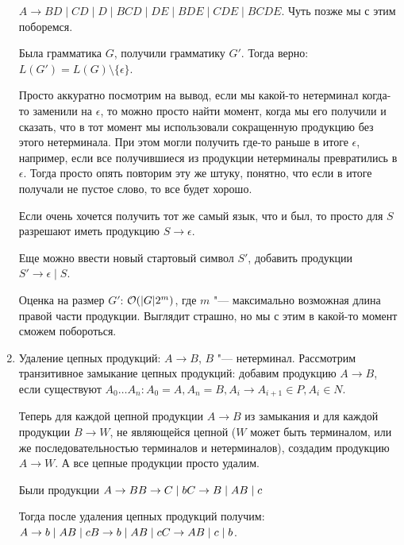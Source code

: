 \begin{enumerate}
\begin{Rem}
$A \to BD \mid CD \mid D \mid BCD \mid DE \mid BDE \mid CDE \mid BCDE$. 
Чуть позже мы с этим поборемся.
\end{Rem}

Была грамматика $G$, получили грамматику $G'$. Тогда верно: $L(G') = L(G) \setminus \{\epsilon\}$.

Просто аккуратно посмотрим на вывод, если мы какой-то нетерминал когда-то заменили на $\epsilon$, то можно просто найти момент, когда мы его получили и сказать, что в тот момент
мы использовали сокращенную продукцию без этого нетерминала.
При этом могли получить где-то раньше в итоге $\epsilon$, например, если все получившиеся из продукции нетерминалы превратились в $\epsilon$. 
Тогда просто опять повторим эту же штуку, понятно, что если в итоге получали не пустое слово, то все будет хорошо.

\begin{Rem}
Если очень хочется получить тот же самый язык, что и был, то просто для $S$ разрешают иметь продукцию $S \to \epsilon$.

Еще можно ввести новый стартовый символ $S'$, добавить продукции $S' \to \epsilon \mid S$.
\end{Rem}

Оценка на размер $G'$: $\mathcal{O}(|G| 2^{m})$, где $m$ "--- максимально возможная длина правой части продукции.
Выглядит страшно, но мы с этим в какой-то момент сможем побороться.

\item
Удаление цепных продукций: $A \to B$, $B$ "--- нетерминал.
Рассмотрим транзитивное замыкание цепных продукций: добавим продукцию $A \to B$, если существуют $A_0 \dots A_n\colon A_0 = A, A_n = B, A_i \to A_{i + 1} \in P, A_i \in N$.

Теперь для каждой цепной продукции $A \to B$ из замыкания и для каждой продукции $B \to W$, не являющейся цепной 
($W$ может быть терминалом, или же последовательностью терминалов и нетерминалов), создадим продукцию $A \to W$.
А все цепные продукции просто удалим.

\begin{exmp}
Были продукции $\\
A \to B \\
B \to C \mid b \\
C \to B \mid AB \mid c 
$

Тогда после удаления цепных продукций получим: $\\
A \to b \mid AB \mid c \\
B \to b \mid AB \mid c \\
C \to AB \mid c \mid b
$.


\end{exmp}
\end{enumerate}
